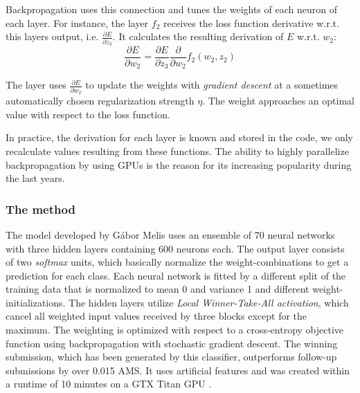 Backpropagation uses this connection and tunes the weights of each neuron of each layer. For instance, the layer $f_2$ receives the loss function derivative w.r.t. this layers output, i.e. $\frac{\partial E}{\partial z_3}$. It calculates the resulting derivation of $E$ w.r.t. $w_2$:
\begin{equation}\label{eq:nn_Ew2}
	\frac{\partial E}{\partial w_2} = \frac{\partial E}{\partial z_3} \frac{\partial}{\partial w_2} f_2(w_2,z_2)
\end{equation}

The layer uses $\frac{\partial E}{\partial w_2}$ to update the weights with \emph{gradient descent} at a sometimes automatically chosen regularization strength $\eta$. The weight approaches an optimal value with respect to the loss function.

In practice, the derivation for each layer is known and stored in the code, we only recalculate values resulting from these functions. The ability to highly parallelize backpropagation by using GPUs is the reason for its increasing popularity during the last years.

\subsubsection{The method}
The model developed by Gábor Melis uses an ensemble of 70 neural networks with three hidden layers containing 600 neurons each. The output layer consists of two \emph{softmax} units, which basically normalize the weight-combinations to get a prediction for each class.
Each neural network is fitted by a different split of the training data that is normalized to mean 0 and variance 1 and different weight-initializations. The hidden layers utilize \emph{Local Winner-Take-All activation}, which cancel all weighted input values received by three blocks except for the maximum. The weighting is optimized with respect to a cross-entropy objective function using backpropagation with stochastic gradient descent.
The winning submission, which has been generated by this classifier, outperforms follow-up submissions by over 0.015 AMS. It uses artificial features and was created within a runtime of 10 minutes on a GTX Titan GPU \cite{meli14}.



\pagebreak

	{\pagebreak \thispagestyle{empty} \cleardoublepage}{\clearpage}